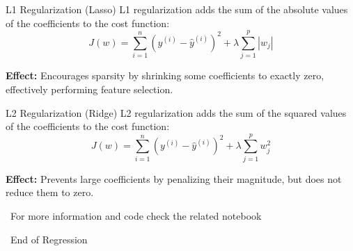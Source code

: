\documentclass[serif, aspectratio=169]{beamer}
\begin{document}
\begin{frame}{L1 Regularization (Lasso)}
L1 regularization adds the sum of the absolute values of the coefficients to the cost function:
\begin{equation}
J(w) = \sum_{i=1}^{n} \left( y^{(i)} - \hat{y}^{(i)} \right)^2 + \lambda \sum_{j=1}^{p} |w_j|
\end{equation}

\textbf{Effect:} Encourages sparsity by shrinking some coefficients to exactly zero, effectively performing feature selection.
\end{frame}

\begin{frame}{L2 Regularization (Ridge)}
L2 regularization adds the sum of the squared values of the coefficients to the cost function:
\begin{equation}
J(w) = \sum_{i=1}^{n} \left( y^{(i)} - \hat{y}^{(i)} \right)^2 + \lambda \sum_{j=1}^{p} w_j^2
\end{equation}

\textbf{Effect:} Prevents large coefficients by penalizing their magnitude, but does not reduce them to zero.
\end{frame}



\begin{frame}
    \begin{center}
        {\Huge\ \color{red}For more information and code check the related notebook}
    \end{center}
\end{frame}


\begin{frame}
    \begin{center}
        {\Huge\ End of Regression}
    \end{center}
\end{frame}
\end{document}
